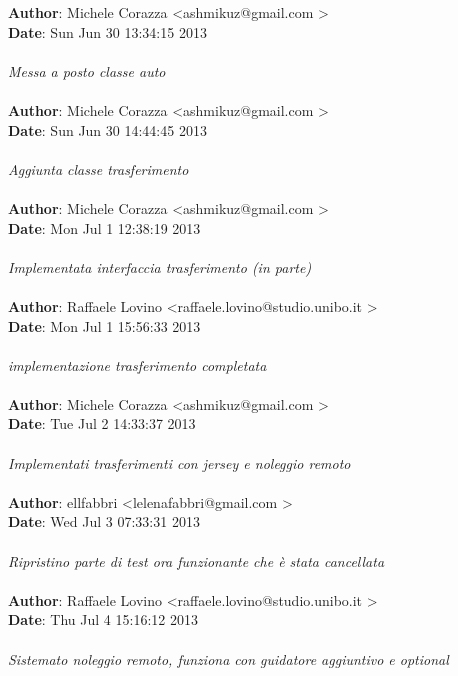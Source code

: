 \documentclass[a4paper,12pt]{article} %
\begin{document}
\textbf{Author}: Michele Corazza \textless ashmikuz@gmail.com \textgreater \\
\textbf{Date}:   Sun Jun 30 13:34:15 2013 \\
\\
    \emph{Messa a posto classe auto}\\
\\
\textbf{Author}: Michele Corazza \textless ashmikuz@gmail.com \textgreater \\
\textbf{Date}:   Sun Jun 30 14:44:45 2013 \\
\\
    \emph{Aggiunta classe trasferimento}\\
\\
\textbf{Author}: Michele Corazza \textless ashmikuz@gmail.com \textgreater \\
\textbf{Date}:   Mon Jul 1 12:38:19 2013 \\
\\
    \emph{Implementata interfaccia trasferimento (in parte)}\\
\\
\textbf{Author}: Raffaele Lovino \textless raffaele.lovino@studio.unibo.it \textgreater \\
\textbf{Date}:   Mon Jul 1 15:56:33 2013 \\
\\
    \emph{implementazione trasferimento completata}\\
\\
\textbf{Author}: Michele Corazza \textless ashmikuz@gmail.com \textgreater \\
\textbf{Date}:   Tue Jul 2 14:33:37 2013 \\
\\
    \emph{Implementati trasferimenti con jersey e noleggio remoto}\\
\\
\textbf{Author}: ellfabbri \textless lelenafabbri@gmail.com \textgreater \\
\textbf{Date}:   Wed Jul 3 07:33:31 2013 \\
\\
    \emph{Ripristino parte di test ora funzionante che è stata cancellata}\\
\\
\textbf{Author}: Raffaele Lovino \textless raffaele.lovino@studio.unibo.it \textgreater \\
\textbf{Date}:   Thu Jul 4 15:16:12 2013 \\
\\
    \emph{Sistemato noleggio remoto, funziona con guidatore aggiuntivo e optional}\\
\end{document}
